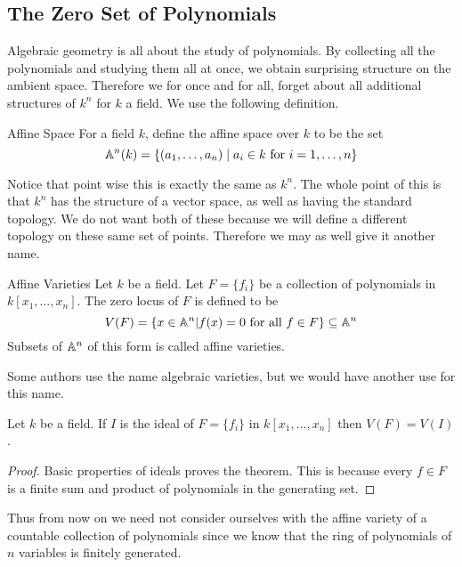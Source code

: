 \documentclass[a4paper]{article}
\begin{document}
\subsection{The Zero Set of Polynomials}
Algebraic geometry is all about the study of polynomials. By collecting all the polynomials and studying them all at once, we obtain surprising structure on the ambient space. Therefore we for once and for all, forget about all additional structures of $k^n$ for $k$ a field. We use the following definition. 

\begin{defn}{Affine Space}{} For a field $k$, define the affine space over $k$ to be the set $$\mathbb{A}^n(k)=\{(a_1,\dots,a_n)\;|\;a_i\in k\text{ for }i=1,\dots,n\}$$
\end{defn}

Notice that point wise this is exactly the same as $k^n$. The whole point of this is that $k^n$ has the structure of a vector space, as well as having the standard topology. We do not want both of these because we will define a different topology on these same set of points. Therefore we may as well give it another name. 

\begin{defn}{Affine Varieties}{} Let $k$ be a field. Let $F=\{f_i\}$ be a collection of polynomials in $k[x_1,\dots,x_n]$. The zero locus of $F$ is defined to be $$V(F)=\{x\in\mathbb{A}^n|f(x)=0\text{ for all }f\in F\}\subseteq\mathbb{A}^n$$ Subsets of $\mathbb{A}^n$ of this form is called affine varieties. 
\end{defn}

Some authors use the name algebraic varieties, but we would have another use for this name. 

\begin{prp}{}{} Let $k$ be a field. If $I$ is the ideal of $F=\{f_i\}$ in $k[x_1,\dots,x_n]$ then $V(F)=V(I)$. \tcbline
\begin{proof}
Basic properties of ideals proves the theorem. This is because every $f\in F$ is a finite sum and product of polynomials in the generating set. 
\end{proof}
\end{prp}

Thus from now on we need not consider ourselves with the affine variety of a countable collection of polynomials since we know that the ring of polynomials of $n$ variables is finitely generated. 
\end{document}
